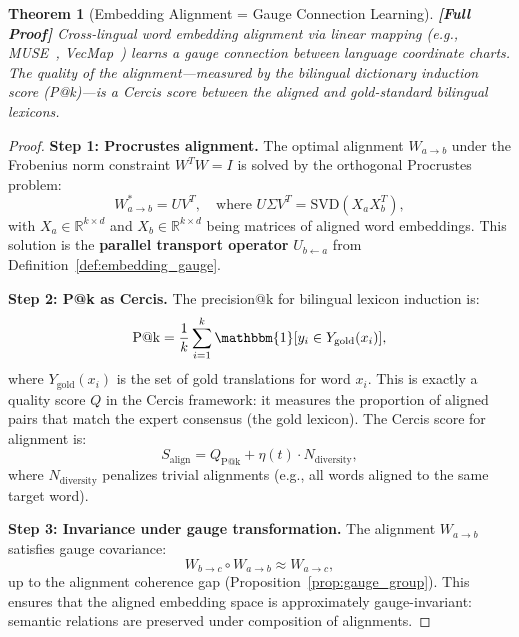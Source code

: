 \documentclass[12pt,a4paper]{article}
\newtheorem{theorem}{Theorem}[section]
\theoremstyle{remark}
\newcommand{\R}{\mathbb{R}}
\newcommand{\Cercis}{\textsf{Cercis}}
\newcommand{\rigorFull}{\textbf{[Full Proof]}}
\begin{document}
\begin{theorem}[Embedding Alignment = Gauge Connection Learning]
\label{thm:embedding_alignment}
\rigorFull
Cross-lingual word embedding alignment via linear mapping (e.g.,
MUSE~\cite{conneau2018word}, VecMap~\cite{artetxe2018massively})
learns a gauge connection between language coordinate charts.
The quality of the alignment---measured by the bilingual dictionary
induction score (P@k)---is a \Cercis{} score between the aligned
and gold-standard bilingual lexicons.
\end{theorem}

\begin{proof}
\noindent\textbf{Step 1: Procrustes alignment.}
The optimal alignment $W_{a\to b}$ under the Frobenius norm constraint
$W^T W = I$ is solved by the orthogonal Procrustes problem:
\begin{equation}
  W_{a\to b}^* = UV^T, \quad \text{where } U \Sigma V^T = \text{SVD}(X_a X_b^T),
\end{equation}
with $X_a \in \R^{k \times d}$ and $X_b \in \R^{k \times d}$ being matrices
of aligned word embeddings. This solution is the \textbf{parallel
transport operator} $U_{b\leftarrow a}$ from Definition~\ref{def:embedding_gauge}.

\smallskip
\noindent\textbf{Step 2: P@k as Cercis.}
The precision@k for bilingual lexicon induction is:
\begin{equation}
  \text{P@k} = \frac{1}{k} \sum_{i=1}^k \mathbbm{1}[y_i \in Y_{\text{gold}}(x_i)],
\end{equation}
where $Y_{\text{gold}}(x_i)$ is the set of gold translations for word $x_i$.
This is exactly a quality score $Q$ in the \Cercis{} framework: it measures
the proportion of aligned pairs that match the expert consensus (the gold
lexicon). The \Cercis{} score for alignment is:
\begin{equation}
  S_{\text{align}} = Q_{\text{P@k}} + \eta(t) \cdot N_{\text{diversity}},
\end{equation}
where $N_{\text{diversity}}$ penalizes trivial alignments (e.g., all words
aligned to the same target word).

\smallskip
\noindent\textbf{Step 3: Invariance under gauge transformation.}
The alignment $W_{a\to b}$ satisfies gauge covariance:
\begin{equation}
  W_{b\to c} \circ W_{a\to b} \approx W_{a\to c},
\end{equation}
up to the alignment coherence gap (Proposition~\ref{prop:gauge_group}).
This ensures that the aligned embedding space is approximately
gauge-invariant: semantic relations are preserved under composition
of alignments.
\end{proof}
\end{document}
